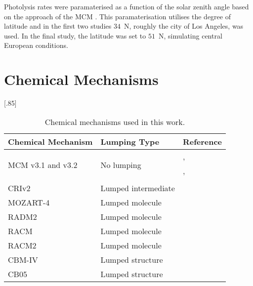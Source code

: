 Photolysis rates were paramaterised as a function of the solar zenith angle based on the approach of the MCM \citep{Jenkin:1997}.
This paramaterisation utilises the degree of latitude and in the first two studies $34$~\degree N, roughly the city of Los Angeles, was used.
In the final study, the latitude was set to $51$~\degree N, simulating central European conditions.

\newpage
\section{Chemical Mechanisms} \label{s:chemical_mechanisms}
{%
    \renewcommand{\arraystretch}{1.1}%
    \begin{table}[t]%
        \begin{center}%
            \caption{Chemical mechanisms used in this work.}%
            \vspace{4mm}
            \scalebox{.85}[.85]{\begin{tabular}{lll}%
                    \hline \hline
                    \textbf{Chemical Mechanism} & \textbf{Lumping Type} & \textbf{Reference} \\
                    \hline \hline
                    \multirow{3}{*}{MCM v3.1 and v3.2} & \multirow{3}{*}{No lumping} & \citet{Jenkin:1997}, \citet{Jenkin:2003} \\
                    & & \citet{Saunders:2003}, \citet{Bloss:2005} \\
                    & & \citet{MCM_Site} \\
                    CRIv2 & Lumped intermediate & \citet{Jenkin:2008} \\
                    MOZART-4 & Lumped molecule & \citet{Emmons:2010} \\
                    RADM2 & Lumped molecule & \citet{Stockwell:1990} \\
                    RACM & Lumped molecule & \citet{Stockwell:1997} \\
                    RACM2 & Lumped molecule & \citet{Goliff:2013} \\
                    CBM-IV & Lumped structure & \citet{Gery:1989} \\
                    CB05 & Lumped structure & \citet{Yarwood:2005} \\
                    \hline \hline
                \end{tabular}%
            }%
            \label{t:mechanisms}%
        \end{center}%
    \end{table}%
}


